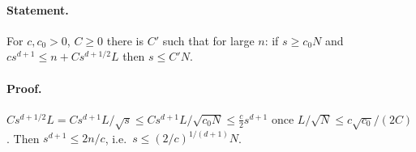 \paragraph{Statement.} For $c,c_0>0$, $C\geq0$ there is $C'$ such that for large $n$: if $s\geq c_0N$ and $cs^{d+1}\leq n+Cs^{d+1/2}L$ then $s\leq C'N$.
\paragraph{Proof.} $Cs^{d+1/2}L=Cs^{d+1}L/\sqrt s\leq Cs^{d+1}L/\sqrt{c_0N}\leq\frac c2s^{d+1}$ once $L/\sqrt N\leq c\sqrt{c_0}/(2C)$. Then $s^{d+1}\leq2n/c$, i.e.\
$s\leq(2/c)^{1/(d+1)}N$.
